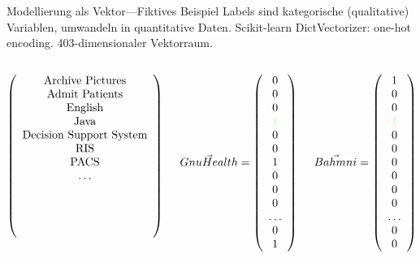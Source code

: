 \documentclass[aspectratio=1610]{beamer}%
\newcommand{\both}[1]{{\color[rgb]{0.8,1,0.8}\textbf{#1}}}
\begin{document}
\begin{frame}{Modellierung als Vektor---Fiktives Beispiel}
{
\small
Labels sind kategorische (qualitative) Variablen, umwandeln in quantitative Daten. Scikit-learn DictVectorizer: one-hot encoding. 403-dimensionaler Vektorraum.
}
\begin{columns}
 
 \begin{column}{.4\textwidth}
   \[\left(\begin{array}{c} \textnormal{Archive Pictures} \\ \textnormal{Admit Patients} \\ \textnormal{English} \\ \textnormal{Java} \\ \textnormal{Decision Support System} \\ \textnormal{RIS} \\ \textnormal{PACS} \\ \dots \\ \\ \\ \\ \\ \end{array}\right) \]
 \end{column}
 
 \begin{column}{.25\textwidth}
   \[\vec{GnuHealth}	= \left(\begin{array}{c} 0 \\ 0 \\ 0 \\ \both{1} \\ 0 \\ 0 \\ 1 \\ 0 \\ 0 \\ 0 \\ \ldots \\ 0 \\ 1 \end{array}\right) \]
 \end{column}

 \begin{column}{.25\textwidth}
   \[\vec{Bahmni}		= \left(\begin{array}{c} 1 \\ 0 \\ 0 \\ \both{1} \\ 0 \\ 0 \\ 0 \\ 0 \\ 0 \\ 0 \\ \ldots \\ 0 \\ 0 \end{array}\right) \]
 \end{column}
\end{columns}

\end{frame}
\end{document}
